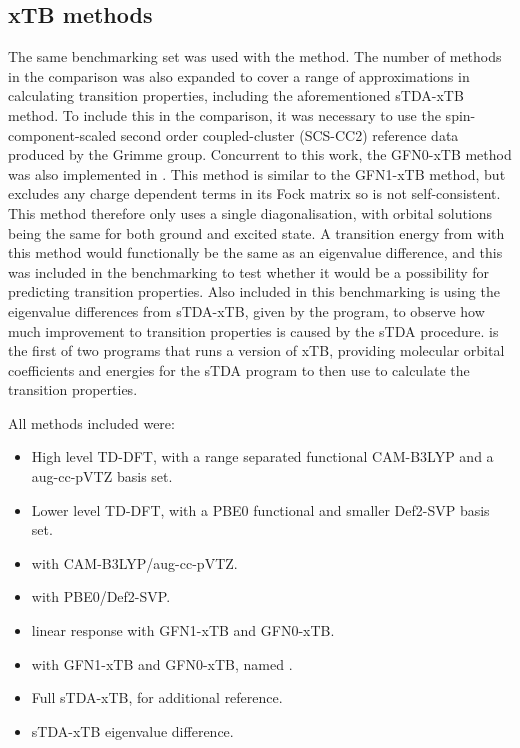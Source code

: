 \subsection{xTB methods}
\label{subsec:dscf_gfn_tests}
The same benchmarking set was used with the \dxtb method. The number of methods
in the comparison was also expanded to cover a range of approximations in calculating
transition properties, including the aforementioned sTDA-xTB method. To include 
this in the comparison, it was necessary to use the spin-component-scaled second
order coupled-cluster (SCS-CC2) \cite{Hattig2000, Hellweg2008} reference data produced
by the Grimme group.
Concurrent to this work, the GFN0-xTB method was also implemented in .
This method is similar to the GFN1-xTB method, but excludes any charge dependent
terms in its Fock matrix so is not self-consistent. This method therefore only
uses a single diagonalisation, with orbital solutions being the same for both
ground and excited state. A transition energy from \dscf with this method would
functionally be the same as an eigenvalue difference, and this was included in 
the benchmarking to test whether it would be a possibility for predicting transition
properties.
Also included in this benchmarking is using the eigenvalue differences from
sTDA-xTB, given by the  program, to observe how much improvement
to transition properties is caused by the sTDA procedure.  is the 
first of two programs that runs a version of xTB, providing molecular orbital
coefficients and energies for the sTDA program to then use to calculate the transition
properties.

All methods included were:
\begin{itemize}
    \item High level TD-DFT, with a range separated functional CAM-B3LYP and
     a aug-cc-pVTZ basis set.
    \item Lower level TD-DFT, with a PBE0 functional and smaller Def2-SVP basis set.
    \item \dscf with CAM-B3LYP/aug-cc-pVTZ.
    \item \dscf with PBE0/Def2-SVP.
    \item linear response with GFN1-xTB and GFN0-xTB.
    \item \dscf with GFN1-xTB and GFN0-xTB, named \dxtb.
    \item Full sTDA-xTB, for additional reference.
    \item sTDA-xTB eigenvalue difference.
\end{itemize}


